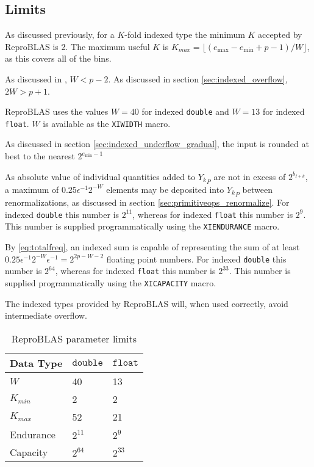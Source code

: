 \subsection{Limits}
    \label{sec:primitiveops_limits}
    As discussed previously, for a $K$-fold indexed type the minimum $K$
    accepted by ReproBLAS is 2. The maximum useful $K$ is
    $K_{max}=\lfloor(e_{\max} - e_{\min} + p - 1)/W\rfloor$,
    as this covers all of the bins.

    As discussed in \cite{repsum}, $W < p - 2$. As discussed in section
    \ref{sec:indexed_overflow}, $2 W > p + 1$.

    ReproBLAS uses the values $W = 40$ for indexed \texttt{double} and $W = 13$
    for indexed \texttt{float}. $W$ is available as the \texttt{XIWIDTH} macro.

    As discussed in section \ref{sec:indexed_underflow_gradual}, the input is
    rounded at best to the nearest $2^{e_{\min} - 1}$

    As absolute value of individual quantities added to ${Y_k}_P$ are not in
    excess of $2^{b_{I + k}}$, a maximum of $0.25\epsilon^{-1}2^{-W}$ elements
    may be deposited into ${Y_k}_P$ between renormalizations, as discussed in
    section \ref{sec:primitiveops_renormalize}. For indexed \texttt{double}
    this number is $2^{11}$, whereas for indexed \texttt{float} this number is
    $2^9$. This number is supplied programmatically using the
    \texttt{XIENDURANCE} macro.

    By \eqref{eq:totalfreq}, an indexed sum is capable of representing the sum
    of at least $0.25\epsilon^{-1}2^{-W}  \epsilon^{-1} = 2^{2  p - W - 2}$
    floating point numbers. For indexed \texttt{double} this number is
    $2^{64}$, whereas for indexed \texttt{float} this number is
    $2^{33}$. This number is supplied programmatically using the
    \texttt{XICAPACITY} macro.

    The indexed types provided by ReproBLAS will, when used correctly, avoid intermediate overflow.

    \begin{table}
        \caption{ReproBLAS parameter limits}
        \begin{tabular}{l | l | l}
            Data Type & $\texttt{double}$ & $\texttt{float}$ \\ \hline
            $W$ & 40 & 13 \\ \hline
            $K_{min}$ & 2 & 2 \\ \hline
            $K_{max}$ & 52 & 21 \\ \hline
            Endurance & $2^{11}$ & $2^9$ \\ \hline
            Capacity & $2^{64}$ & $2^{33}$ \\ \hline
        \end{tabular}
    \end{table}
